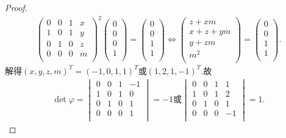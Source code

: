 \documentclass[../../main.tex]{subfiles}
\begin{document}
\begin{proof}
\begin{align*}
\begin{pmatrix}
0&		0&		1&		x\\
1&		0&		1&		y\\
0&		1&		0&		z\\
0&		0&		0&		m\\
\end{pmatrix}^2 \left( \begin{array}{c}
0\\
0\\
0\\
1\\
\end{array} \right) =\left( \begin{array}{c}
0\\
0\\
1\\
1\\
\end{array} \right) \Longleftrightarrow \left( \begin{array}{c}
z+xm\\
x+z+ym\\
y+zm\\
m^2\\
\end{array} \right) =\left( \begin{array}{c}
0\\
0\\
1\\
1\\
\end{array} \right) .
\end{align*}
解得$(x,y,z,m)^T=(-1,0,1,1)^T$或$(1,2,1,-1)^T$.故
\begin{align*}
\det \varphi=\begin{vmatrix}
0&		0&		1&		-1\\
1&		0&		1&		0\\
0&		1&		0&		1\\
0&		0&		0&		1\\
\end{vmatrix}=-1\text{或}\begin{vmatrix}
0&		0&		1&		1\\
1&		0&		1&		2\\
0&		1&		0&		1\\
0&		0&		0&		-1\\
\end{vmatrix}=1.
\end{align*}

\end{proof}
\end{document}

